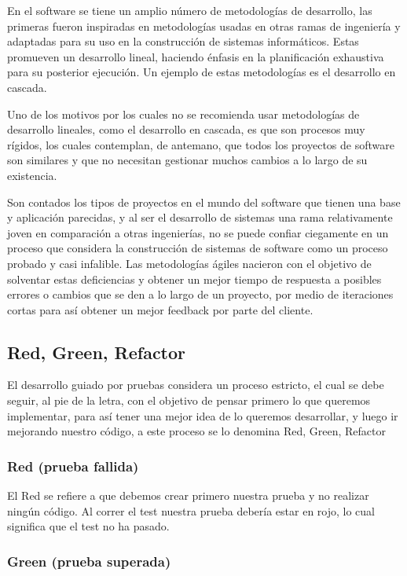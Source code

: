 En el software se tiene un amplio número de metodologías de desarrollo, las
primeras fueron inspiradas en metodologías usadas en otras ramas de ingeniería
y adaptadas para su uso en la construcción de sistemas informáticos. Estas
promueven un desarrollo lineal, haciendo énfasis en la planificación exhaustiva
para su posterior ejecución. Un ejemplo de estas metodologías es el desarrollo
en cascada.

Uno de los motivos por los cuales no se recomienda usar metodologías de
desarrollo lineales, como el desarrollo en cascada, es que son procesos muy
rígidos,  los cuales  contemplan, de antemano, que todos los proyectos de
software son similares y que no necesitan gestionar muchos cambios a lo largo
de su existencia.

Son contados los tipos de proyectos en el mundo del software que tienen una
base y aplicación parecidas, y al ser el desarrollo de sistemas una rama
relativamente joven en comparación a otras ingenierías, no se puede confiar
ciegamente en un proceso que considera la construcción de sistemas de software
como un proceso probado y casi infalible. Las metodologías ágiles nacieron con
el objetivo de solventar estas deficiencias y obtener un mejor tiempo de
respuesta a posibles errores o cambios que se den a lo largo de un proyecto,
por medio de iteraciones cortas para así obtener un mejor feedback por parte
del cliente.

\subsection{Red, Green, Refactor}

El desarrollo guiado por pruebas considera un proceso estricto, el cual se debe
seguir, al pie de la letra, con el objetivo de pensar primero lo que queremos
implementar, para así tener una mejor idea de lo queremos desarrollar, y luego
ir mejorando nuestro código, a este proceso se lo denomina Red, Green, Refactor

\subsubsection{Red (prueba fallida)}

El Red se refiere a que debemos crear primero nuestra prueba y no realizar
ningún código. Al correr el test nuestra prueba debería estar en rojo, lo cual
significa que el test no ha pasado.

\subsubsection{Green (prueba superada)}

